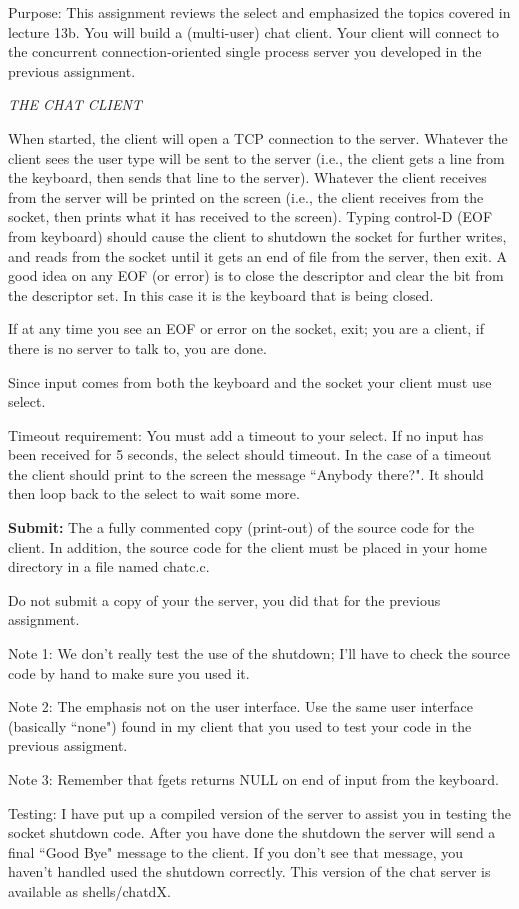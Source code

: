

\parindent 0pt

Purpose: This assignment reviews the select and emphasized the
topics covered in lecture 13b.
You will build a (multi-user) chat client.
Your client will connect to the concurrent connection-oriented single process
server you developed in the previous assignment.

{\it THE CHAT CLIENT}

When started, the client will open a TCP connection to the server.
Whatever the client sees the user type will be sent to the server 
(i.e., the client gets a line from the keyboard, 
then sends that line to the server).
Whatever the client receives from the server will be printed on the screen
(i.e., the client receives from the socket, 
then prints what it has received to the screen).
Typing control-D (EOF from keyboard) should cause the client to 
shutdown the socket for further writes, and reads from the socket until
it gets an end of file from the server, then exit.
A good idea on any EOF (or error) is to close the descriptor and clear the bit
from the descriptor set. In this case it is the keyboard that is
being closed.

If at any time you see an EOF or error on the socket, exit; 
you are a client, if there is no server to talk to, you are done.

Since input comes from both the keyboard and the socket your client
must use select.

Timeout requirement: You must add a timeout to your select.
If no input has been received for 5 seconds, the select should
timeout.
In the case of a timeout the client should print to the screen
the message ``Anybody there?".
It should then loop back to the select to wait some more.

{\bf Submit:} The a fully commented copy (print-out) of the source code for the 
client.
In addition,
the source code for the client must be placed in your home directory
in a file named {\ltt{}chatc.c}.

Do not submit a copy of your the server,
you did that for the previous assignment.

Note 1: We don't really test the use of the shutdown; I'll have to
check the source code by hand to make sure you used it.

Note 2: The emphasis not on the user interface.
Use the same user interface (basically ``none") found in my client
that you used to test your code in the previous assigment.

Note 3: Remember that {\ltt{}fgets} returns {\ltt{}NULL} on end
of input from the keyboard.

Testing:
I have put up a compiled version of the server to assist you in
testing the socket shutdown code. After you have done the shutdown
the server will send a final ``Good Bye" message to the client.
If you don't see that message, you haven't handled used the shutdown
correctly.
This version of the chat server is available as {\ltt{}shells/chatdX}.

\bye

